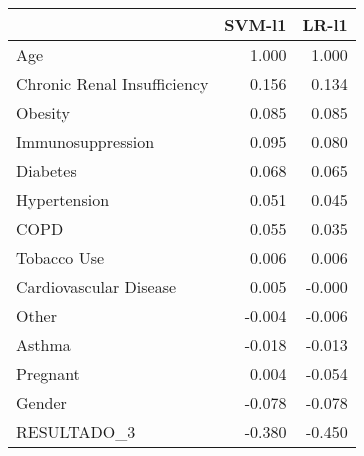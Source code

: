 \begin{tabular}{lrr}
\toprule
{} &  SVM-l1 &  LR-l1 \\
\midrule
Age                         &   1.000 &  1.000 \\
Chronic Renal Insufficiency &   0.156 &  0.134 \\
Obesity                     &   0.085 &  0.085 \\
Immunosuppression           &   0.095 &  0.080 \\
Diabetes                    &   0.068 &  0.065 \\
Hypertension                &   0.051 &  0.045 \\
COPD                        &   0.055 &  0.035 \\
Tobacco Use                 &   0.006 &  0.006 \\
Cardiovascular Disease      &   0.005 & -0.000 \\
Other                       &  -0.004 & -0.006 \\
Asthma                      &  -0.018 & -0.013 \\
Pregnant                    &   0.004 & -0.054 \\
Gender                      &  -0.078 & -0.078 \\
RESULTADO\_3                 &  -0.380 & -0.450 \\
\bottomrule
\end{tabular}
